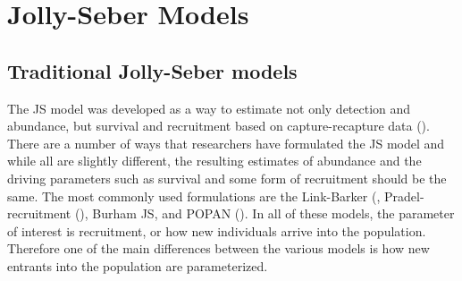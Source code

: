 \section{Jolly-Seber Models}

\subsection{Traditional Jolly-Seber models}

The JS model was developed as a way to estimate not only
detection and abundance, but survival and recruitment based on 
capture-recapture data (\cite{jolly:1965; seber:1965}).   
There are a number of ways that researchers have
formulated the JS model and while
all are slightly different, 
the resulting estimates of abundance and the driving parameters such
as survival and some form of recruitment should be the same.  
The most commonly used formulations are the
Link-Barker (\citep{link_barker:2005}, Pradel-recruitment (\citep{pradel:1996}), Burham JS, 
and POPAN (\citep{schwarz_arnason:1996}).
In all of these models, the parameter of interest
is recruitment, or how new individuals arrive into the population.
Therefore one of the main differences between
the various models is how new entrants into the population are parameterized.


